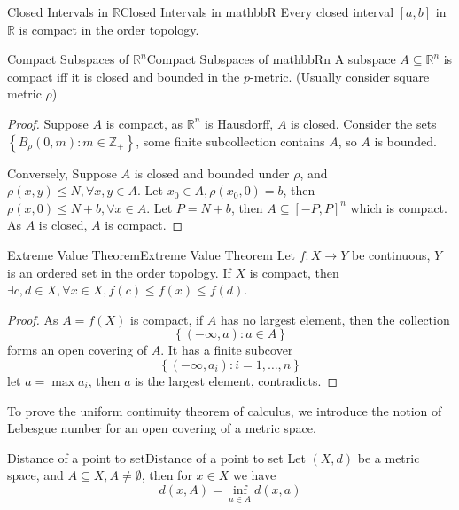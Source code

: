 \documentclass[../main.tex]{subfiles}
\begin{document}
\begin{corollary}{Closed Intervals in $\mathbb{R}$}{Closed Intervals in mathbbR}
	Every closed interval $[a,b]$ in $\mathbb{R}$ is compact in the order topology.
\end{corollary}

\begin{theorem}{Compact Subspaces of $\mathbb{R}^n$}{Compact Subspaces of mathbbRn}
A subspace $A \subseteq \mathbb{R}^n$ is compact iff it is closed and bounded in the $p$-metric. (Usually consider square metric $\rho$)
\end{theorem}
\begin{proof}
Suppose $A$ is compact, as $\mathbb{R}^n$ is Hausdorff, $A$ is closed. Consider the sets $\left\{ B_{\rho}(0,m) : m\in \mathbb{Z}_+ \right\}$, some finite subcollection contains $A$, so $A$ is bounded.

Conversely, Suppose $A$ is closed and bounded under $\rho$, and $\rho(x,y) \leq N,\forall x,y\in A$. Let $x_0\in A, \rho(x_0,0) = b$, then $\rho(x,0) \leq N+b, \forall x\in A$. Let $P=N+b$, then $A \subseteq [-P,P]^n$ which is compact. As $A$ is closed, $A$ is compact.
\end{proof}

\begin{theorem}{Extreme Value Theorem}{Extreme Value Theorem}
Let $f:X \rightarrow Y$ be continuous, $Y$ is an ordered set in the order topology. If $X$ is compact, then $\exists c,d\in X,\forall x\in X,f(c)\leq f(x)\leq f(d)$.
\end{theorem}
\begin{proof}
As $A = f(X)$ is compact, if $A$ has no largest element, then the collection
\begin{equation*}
\left\{ (-\infty ,a):a\in A \right\}
\end{equation*}
forms an open covering of $A$. It has a finite subcover
\begin{equation*}
\left\{ (-\infty ,a_i):i=1, \ldots ,n \right\}
\end{equation*}
let $a=\max a_i$,  then $a$ is the largest element, contradicts.
\end{proof}

To prove the uniform continuity theorem of calculus, we introduce the notion of Lebesgue number for an open covering of a metric space.

\begin{definition}{Distance of a point to set}{Distance of a point to set}
Let $(X,d)$ be a metric space, and $A \subseteq X,A\neq \emptyset $, then for $x\in X$ we have
\begin{equation*}
	d(x,A) = \inf_{a\in A} d(x,a)
\end{equation*}
\end{definition}
\end{document}
